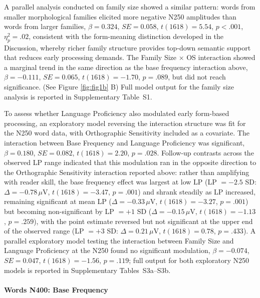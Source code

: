 \documentclass[utf8]{FrontiersinHarvard} %
\begin{document}
	A parallel analysis conducted on family size showed a similar pattern: words from smaller morphological families elicited more negative N250 amplitudes than words from larger families, $\beta = 0.324$, $SE = 0.058$, $t(1618) = 5.54$, $p < .001$, $\eta^2_p = .02$, consistent with the form-meaning distinction developed in the Discussion, whereby richer family structure provides top-down semantic support that reduces early processing demands. The Family Size $\times$ OS interaction showed a marginal trend in the same direction as the base frequency interaction above, $\beta = -0.111$, $SE = 0.065$, $t(1618) = -1.70$, $p = .089$, but did not reach significance.  (See Figure \ref{fig:fig1b} B) Full model output for the family size analysis is reported in Supplementary Table~S1.

	To assess whether Language Proficiency also modulated early form-based processing, an exploratory model reversing the interaction structure was fit for the N250 word data, with Orthographic Sensitivity included as a covariate. The interaction between Base Frequency and Language Proficiency was significant, $\beta = 0.180$, $SE = 0.082$, $t(1618) = 2.20$, $p = .028$. Follow-up contrasts across the observed LP range indicated that this modulation ran in the opposite direction to the Orthographic Sensitivity interaction reported above: rather than amplifying with reader skill, the base frequency effect was largest at low LP (LP $= -2.5$ SD: $\Delta = -0.78\,\mu$V, $t(1618) = -3.47$, $p = .001$) and shrank steadily as LP increased, remaining significant at mean LP ($\Delta = -0.33\,\mu$V, $t(1618) = -3.27$, $p = .001$) but becoming non-significant by LP $= +1$ SD ($\Delta = -0.15\,\mu$V, $t(1618) = -1.13$, $p = .259$), with the point estimate reversed but not significant at the upper end of the observed range (LP $= +3$ SD: $\Delta = 0.21\,\mu$V, $t(1618) = 0.78$, $p = .433$). A parallel exploratory model testing the interaction between Family Size and Language Proficiency at the N250 found no significant modulation, $\beta = -0.074$, $SE = 0.047$, $t(1618) = -1.56$, $p = .119$; full output for both exploratory N250 models is reported in Supplementary Tables~S3a--S3b.

	\paragraph*{Words N400: Base Frequency}
	
\end{document}
